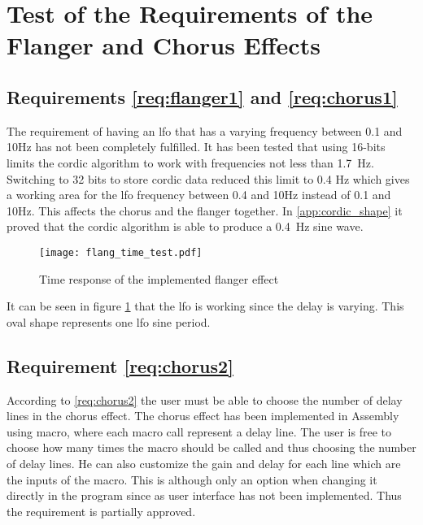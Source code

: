 \newpage
\section{Test of the Requirements of the Flanger and Chorus Effects}

\subsection{Requirements \ref{req:flanger1} and \ref{req:chorus1}}

The requirement of having an \gls{lfo} that has a varying frequency between 0.1 and 10Hz has not been completely fulfilled. It has been tested that using 16-bits limits the \gls{cordic} algorithm to work with frequencies not less than \SI{1.7}{\hertz}. Switching to 32 bits to store \gls{cordic} data reduced this limit to 0.4 Hz which gives a working area for the \gls{lfo} frequency between 0.4 and 10Hz instead of 0.1 and 10Hz. This affects the chorus and the flanger together. In \autoref{app:cordic_shape} it proved that the \gls{cordic} algorithm is able to produce a \SI{0.4}{\hertz} sine wave.

\begin{figure}[hbt]
	\centering
  \texttt{[image: flang\_time\_test.pdf]}
  \caption{Time response of the implemented flanger effect}
  \label{fig:flang_time_test}
\end{figure}

It can be seen in figure \ref{fig:flang_time_test} that the \gls{lfo} is working since the delay is varying. This oval shape represents one \gls{lfo} sine period. 



\subsection{Requirement \ref{req:chorus2}}

According to \autoref{req:chorus2} the user must be able to choose the number of delay lines in the chorus effect. The chorus effect has been implemented in Assembly using macro, where each macro call represent a delay line. The user is free to choose how many times the macro should be called and thus choosing the number of delay lines. He can also customize the gain and delay for each line which are the inputs of the macro. This is although only an option when changing it directly in the program since as user interface has not been implemented. Thus the requirement is partially approved.

